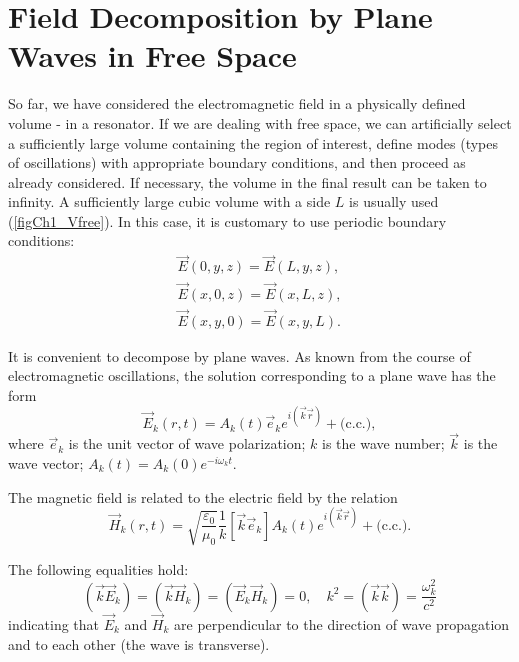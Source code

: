 \section{Field Decomposition by Plane Waves in Free Space}
So far, we have considered the electromagnetic field in a physically defined volume - in a resonator. If we are dealing with free space, we can artificially select a sufficiently large volume containing the region of interest, define modes (types of oscillations) with appropriate boundary conditions, and then proceed as already considered. If necessary, the volume in the final result can be taken to infinity. A sufficiently large cubic volume with a side $L$ is usually used (\autoref{figCh1_Vfree}). In this case, it is customary to use periodic boundary conditions:  
\begin{eqnarray}
\vec{E}\left(0, y, z \right) = \vec{E}\left(L, y, z \right),
\nonumber \\
\vec{E}\left(x, 0, z \right) = \vec{E}\left(x, L, z \right),
\nonumber \\
\vec{E}\left(x, y, 0 \right) = \vec{E}\left(x, y, L \right).
\label{eqCh1_period_def}
\end{eqnarray}



It is convenient to decompose by plane waves. As known from the course of electromagnetic oscillations, the solution corresponding to a plane wave has the form 
\begin{equation}
\vec{E}_k\left(r, t\right) = 
A_k\left(t\right)\vec{e}_k e^{i\left(\vec{k}\vec{r}\right)} +
\mbox{(c.c.)},
\label{eqCh1_Emode}
\end{equation}
where $\vec{e}_k$ is the unit vector of wave polarization;  
$k$ is the wave number; $\vec{k}$ is the wave vector;  
$A_k\left(t\right) = A_k\left(0\right) e^{-i \omega_k t}$.

The magnetic field is related to the electric field by the relation
\begin{equation}
\vec{H}_k\left(r, t\right) =
\sqrt{\frac{\varepsilon_0}{\mu_0}}
\frac{1}{k}\left[\vec{k} \vec{e}_k\right] A_k\left(t\right) 
e^{i\left(\vec{k}\vec{r}\right)} + \mbox{(c.c.)}
.
\label{eqCh1_Hmode}
\end{equation}

The following equalities hold:
\begin{equation}
\left(\vec{k}\vec{E}_k\right) = 
\left(\vec{k}\vec{H}_k\right) = 
\left(\vec{E}_k\vec{H}_k\right) = 0,
\quad
k^2 = \left(\vec{k}\vec{k}\right) = 
\frac{\omega_k^2}{c^2} 
\end{equation}
indicating that 
$\vec{E}_k$
and $\vec{H}_k$ are perpendicular to the direction of wave propagation and to each other (the wave is transverse). 

